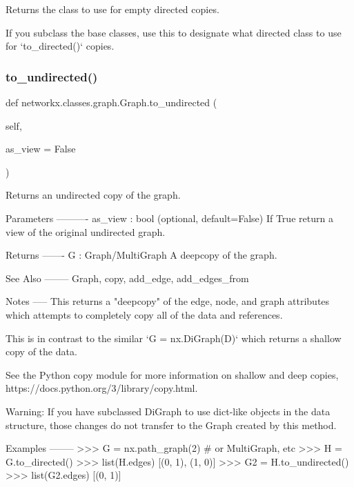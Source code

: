 \begin{DoxyVerb}Returns the class to use for empty directed copies.

If you subclass the base classes, use this to designate
what directed class to use for `to_directed()` copies.
\end{DoxyVerb}
 \mbox{\label{classnetworkx_1_1classes_1_1graph_1_1Graph_aabcff98c46e402281de59737607261cf}} 
\subsubsection{\texorpdfstring{to\+\_\+undirected()}{to\_undirected()}}
{\footnotesize\ttfamily def networkx.\+classes.\+graph.\+Graph.\+to\+\_\+undirected (\begin{DoxyParamCaption}\item[{}]{self,  }\item[{}]{as\+\_\+view = {\ttfamily False} }\end{DoxyParamCaption})}

\begin{DoxyVerb}Returns an undirected copy of the graph.

Parameters
----------
as_view : bool (optional, default=False)
  If True return a view of the original undirected graph.

Returns
-------
G : Graph/MultiGraph
    A deepcopy of the graph.

See Also
--------
Graph, copy, add_edge, add_edges_from

Notes
-----
This returns a "deepcopy" of the edge, node, and
graph attributes which attempts to completely copy
all of the data and references.

This is in contrast to the similar `G = nx.DiGraph(D)` which returns a
shallow copy of the data.

See the Python copy module for more information on shallow
and deep copies, https://docs.python.org/3/library/copy.html.

Warning: If you have subclassed DiGraph to use dict-like objects
in the data structure, those changes do not transfer to the
Graph created by this method.

Examples
--------
>>> G = nx.path_graph(2)  # or MultiGraph, etc
>>> H = G.to_directed()
>>> list(H.edges)
[(0, 1), (1, 0)]
>>> G2 = H.to_undirected()
>>> list(G2.edges)
[(0, 1)]
\end{DoxyVerb}
 \mbox{\label{classnetworkx_1_1classes_1_1graph_1_1Graph_a38391a01e0e114d42dc0c89d159b79b4}} 
